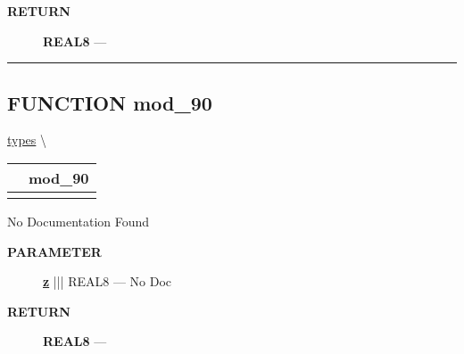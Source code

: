\par
\begin{description}
\item [\colorbox{tagtype}{\color{white} \textbf{\textsf{RETURN}}}] \textbf{REAL8} --- 
\end{description}




\rule{\linewidth}{0.5pt}
\subsection*{\textsf{\colorbox{headtoc}{\color{white} FUNCTION}
mod\_90}}

\hypertarget{ecldoc:types.mod_90}{}
\hspace{0pt} \hyperlink{ecldoc:types}{types} \textbackslash 

{\renewcommand{\arraystretch}{1.5}
\begin{tabularx}{\textwidth}{|>{\raggedright\arraybackslash}l|X|}
\hline
\hspace{0pt}\mytexttt{\color{red} } & \textbf{mod\_90} \\
\hline
\multicolumn{2}{|>{\raggedright\arraybackslash}X|}{\hspace{0pt}\mytexttt{\color{param} (REAL8 z)}} \\
\hline
\end{tabularx}
}

\par





No Documentation Found






\par
\begin{description}
\item [\colorbox{tagtype}{\color{white} \textbf{\textsf{PARAMETER}}}] \textbf{\underline{z}} ||| REAL8 --- No Doc
\end{description}







\par
\begin{description}
\item [\colorbox{tagtype}{\color{white} \textbf{\textsf{RETURN}}}] \textbf{REAL8} --- 
\end{description}




